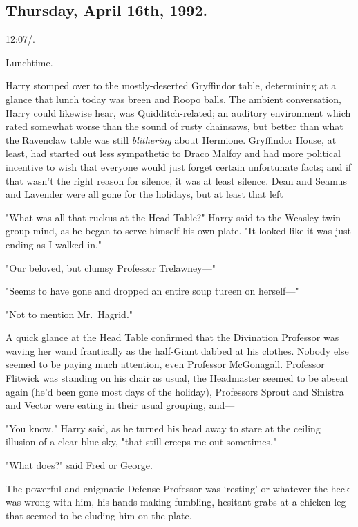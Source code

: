 
\subsection{Thursday, April 16th, 1992.}

12:07\PM/.

Lunchtime.

Harry stomped over to the mostly-deserted Gryffindor table, determining at a
glance that lunch today was breen and Roopo balls. The ambient conversation,
Harry could likewise hear, was Quidditch-related; an auditory environment which
rated somewhat worse than the sound of rusty chainsaws, but better than what
the Ravenclaw table was still \emph{blithering} about Hermione. Gryffindor
House, at least, had started out less sympathetic to Draco Malfoy and had more
political incentive to wish that everyone would just forget certain unfortunate
facts; and if that wasn't the right reason for silence, it was at least
silence. Dean and Seamus and Lavender were all gone for the holidays, but at
least that left{\el}

"What was all that ruckus at the Head Table?" Harry said to the Weasley-twin
group-mind, as he began to serve himself his own plate. "It looked like it was
just ending as I walked in."

"Our beloved, but clumsy Professor Trelawney\mbox{---}"

"Seems to have gone and dropped an entire soup tureen on herself\mbox{---}"

"Not to mention Mr.~Hagrid."

A quick glance at the Head Table confirmed that the Divination Professor was
waving her wand frantically as the half-Giant dabbed at his clothes. Nobody
else seemed to be paying much attention, even Professor McGonagall. Professor
Flitwick was standing on his chair as usual, the Headmaster seemed to be absent
again (he'd been gone most days of the holiday), Professors Sprout and Sinistra
and Vector were eating in their usual grouping, and---

"You know," Harry said, as he turned his head away to stare at the ceiling
illusion of a clear blue sky, "that still creeps me out sometimes."

"What does?" said Fred or George.

The powerful and enigmatic Defense Professor was `resting' or
whatever-the-heck-was-wrong-with-him, his hands making fumbling, hesitant grabs
at a chicken-leg that seemed to be eluding him on the plate.

